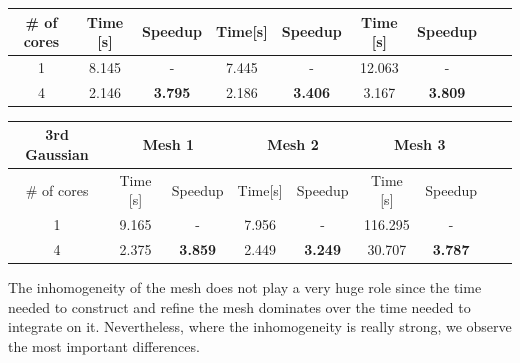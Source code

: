 \documentclass[8pt]{beamer}
\begin{document}
\begin{frame}
\begin{footnotesize}
\begin{center}
\begin{tabular}{|c|c|c|c|c|c|c|c|c|}
    \hline
    \# of cores & Time [s] & Speedup & Time[s] & Speedup & Time [s] & Speedup \\
    \hline
    1 & 8.145 & - & 7.445 & - & 12.063 & - \\
    4 & 2.146 & \textbf{3.795} & 2.186 & \textbf{3.406} & 3.167 & \textbf{3.809} \\
    \hline
\end{tabular}
\end{center}
\begin{center}
\begin{tabular}{|c|c|c|c|c|c|c|c|c|} 
   \hline
    \textbf{3rd Gaussian}& \multicolumn{2}{|c|}{Mesh 1} & \multicolumn{2}{|c|}{Mesh 2} & \multicolumn{2}{|c|}{Mesh 3}\\
    \hline
    \# of cores & Time [s] & Speedup & Time[s] & Speedup & Time [s] & Speedup \\
    \hline
    1 & 9.165 & - & 7.956 & - & 116.295 & - \\
    4 & 2.375 & \textbf{3.859} & 2.449 & \textbf{3.249} & 30.707 & \textbf{3.787} \\
    \hline
\end{tabular}
\end{center}
\end{footnotesize}
\end{frame}

\begin{frame}
The inhomogeneity of the mesh does not play a very huge role since the time needed to construct and refine the mesh dominates over the time needed to integrate on it.
Nevertheless, where the inhomogeneity is really strong, we observe the most important differences.
\end{frame}
\end{document}
